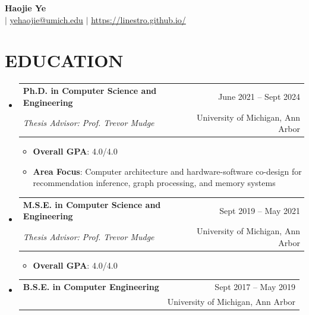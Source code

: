 \documentclass[a4paper,12pt]{article}
\makeatletter
\newcommand{\resumeItem}[1]{\item\small{{#1 \vspace{-1pt}}}}
\newcommand{\resumeSubheading}[4]{
  \vspace{-1pt}\item
    \begin{tabular*}{\textwidth}[t]{l@{\extracolsep{\fill}}r}
      \textbf{#1} & {\color{dark-grey}\small #2}\vspace{1pt}\\
      \textit{#3} & {\color{dark-grey} \small #4}\\
    \end{tabular*}\vspace{-4pt}
}
\newcommand{\resumeSubHeadingListStart}{\begin{itemize}[leftmargin=0in, label={}]}
\newcommand{\resumeSubHeadingListEnd}{\end{itemize}}
\newcommand{\resumeItemListStart}{\begin{itemize}}
\newcommand{\resumeItemListEnd}{\end{itemize}\vspace{0pt}}
\makeatother
\begin{document}
\begin{center}
  \textbf{\Huge Haojie Ye} \\ \vspace{5pt}
  \small {} \hspace{1pt} $|$
  \hspace{1pt} \faEnvelope \hspace{1pt} \href{mailto:yehaojie@umich.edu}{yehaojie@umich.edu} \hspace{1pt} $|$ \hspace{1pt}
  \href{https://linestro.github.io/}{https://linestro.github.io/}
  \\ \vspace{-3pt}
\end{center}

\section{EDUCATION}
\resumeSubHeadingListStart
\resumeSubheading
{Ph.D. in Computer Science and Engineering}{June 2021 -- Sept 2024}
{Thesis Advisor: Prof. Trevor Mudge}{University of Michigan, Ann Arbor}
\resumeItemListStart
\resumeItem{\textbf{Overall GPA}: 4.0/4.0}
\resumeItem{\textbf{Area Focus}: Computer architecture and hardware-software co-design for recommendation inference, graph processing, and memory systems}
\resumeItemListEnd

\resumeSubheading
{M.S.E. in Computer Science and Engineering}{Sept 2019 -- May 2021}
{Thesis Advisor: Prof. Trevor Mudge}{University of Michigan, Ann Arbor}
\resumeItemListStart
\resumeItem{\textbf{Overall GPA}: 4.0/4.0}
\resumeItemListEnd

\resumeSubheading
{B.S.E. in Computer Engineering}{Sept 2017 -- May 2019}
{}{University of Michigan, Ann Arbor}
\resumeSubHeadingListEnd

\end{document}

